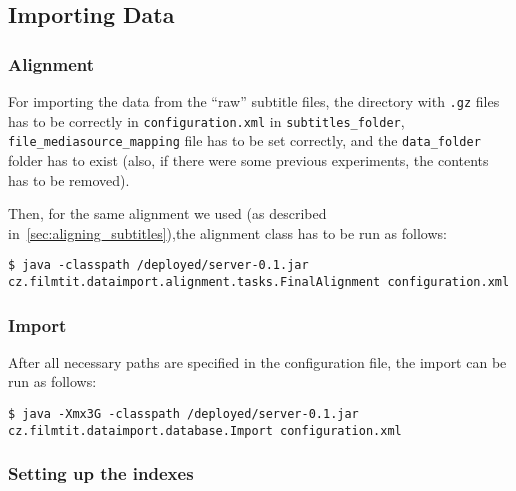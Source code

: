 \subsection{Importing Data}

\label{sec:import}

\subsubsection{Alignment}

For importing the data from the ``raw'' subtitle files, the directory with \texttt{.gz} files has to be correctly in \texttt{configuration.xml} in \texttt{subtitles\_folder}, \texttt{file\_mediasource\_mapping} file has to be set correctly, and the \texttt{data\_folder} folder has to exist (also, if there were some previous experiments, the contents has to be removed).

Then, for the same alignment we used (as described in~\ref{sec:aligning_subtitles}),the alignment class has to be run as follows:


\begin{lstlisting}
$ java -classpath /deployed/server-0.1.jar cz.filmtit.dataimport.alignment.tasks.FinalAlignment configuration.xml
\end{lstlisting}

\subsubsection{Import}

After all necessary paths are specified in the configuration file, the import can be run as follows:

\vspace*{0.5em}
\begin{lstlisting}
$ java -Xmx3G -classpath /deployed/server-0.1.jar cz.filmtit.dataimport.database.Import configuration.xml
\end{lstlisting}
\vspace*{0.5em}


\subsubsection{Setting up the indexes}

